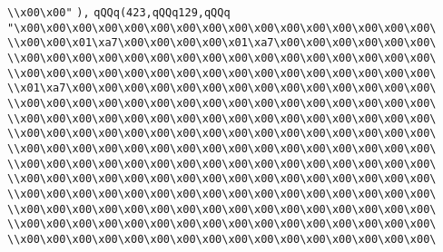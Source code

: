 \verb|\\x00\x00"|\newline
\verb|),|\newline
\verb|qQQq(423,qQQq129,qQQq|\newline
\verb|"\x00\x00\x00\x00\x00\x00\x00\x00\x00\x00\x00\x00\x00\x00\x00\x00\|\newline
\verb|\\x00\x00\x01\xa7\x00\x00\x00\x00\x01\xa7\x00\x00\x00\x00\x00\x00\|\newline
\verb|\\x00\x00\x00\x00\x00\x00\x00\x00\x00\x00\x00\x00\x00\x00\x00\x00\|\newline
\verb|\\x00\x00\x00\x00\x00\x00\x00\x00\x00\x00\x00\x00\x00\x00\x00\x00\|\newline
\verb|\\x01\xa7\x00\x00\x00\x00\x00\x00\x00\x00\x00\x00\x00\x00\x00\x00\|\newline
\verb|\\x00\x00\x00\x00\x00\x00\x00\x00\x00\x00\x00\x00\x00\x00\x00\x00\|\newline
\verb|\\x00\x00\x00\x00\x00\x00\x00\x00\x00\x00\x00\x00\x00\x00\x00\x00\|\newline
\verb|\\x00\x00\x00\x00\x00\x00\x00\x00\x00\x00\x00\x00\x00\x00\x00\x00\|\newline
\verb|\\x00\x00\x00\x00\x00\x00\x00\x00\x00\x00\x00\x00\x00\x00\x00\x00\|\newline
\verb|\\x00\x00\x00\x00\x00\x00\x00\x00\x00\x00\x00\x00\x00\x00\x00\x00\|\newline
\verb|\\x00\x00\x00\x00\x00\x00\x00\x00\x00\x00\x00\x00\x00\x00\x00\x00\|\newline
\verb|\\x00\x00\x00\x00\x00\x00\x00\x00\x00\x00\x00\x00\x00\x00\x00\x00\|\newline
\verb|\\x00\x00\x00\x00\x00\x00\x00\x00\x00\x00\x00\x00\x00\x00\x00\x00\|\newline
\verb|\\x00\x00\x00\x00\x00\x00\x00\x00\x00\x00\x00\x00\x00\x00\x00\x00\|\newline
\verb|\\x00\x00\x00\x00\x00\x00\x00\x00\x00\x00\x00\x00\x00\x00\x00\x00\|\newline

